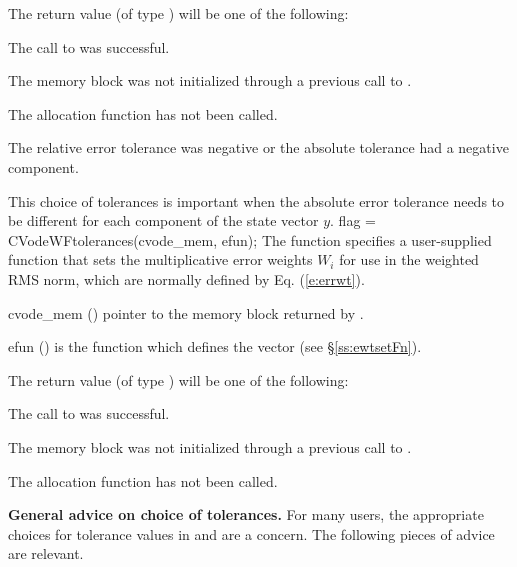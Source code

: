 {
  The return value  (of type ) will be one of the following:
  \begin{args}
  \item[\Id{CV\_SUCCESS}]
    The call to  was successful.
  \item[\Id{CV\_MEM\_NULL}] 
    The {\cvode} memory block was not initialized through a previous call to
    .
  \item[\Id{CV\_NO\_MALLOC}] 
    The allocation function  has not been called.
  \item[\Id{CV\_ILL\_INPUT}] 
    The relative error tolerance was negative or the absolute tolerance
    had a negative component.
  \end{args}
}
{
  This choice of tolerances is important when the absolute error tolerance needs to
  be different for each component of the state vector $y$. 
}
{
  flag = CVodeWFtolerances(cvode\_mem, efun);
}
{
  The function  specifies a user-supplied function 
  that sets the multiplicative error weights $W_i$ for use in the weighted
  RMS norm, which are normally defined by Eq. (\ref{e:errwt}).
}
{
  \begin{args}
  \item[cvode\_mem] ()
    pointer to the {\cvode} memory block returned by .
  \item[efun] () 
    is the {\CC} function which defines the  vector (see
    \S\ref{ss:ewtsetFn}).
  \end{args}
}
{
  The return value  (of type ) will be one of the following:
  \begin{args}
  \item[\Id{CV\_SUCCESS}]
    The call to  was successful.
  \item[\Id{CV\_MEM\_NULL}] 
    The {\cvode} memory block was not initialized through a previous call to
    .
  \item[\Id{CV\_NO\_MALLOC}] 
    The allocation function  has not been called.
  \end{args}
}
{}

{\bf General advice on choice of tolerances.}
For many users, the appropriate choices for tolerance values in
 and  are a concern.  The following pieces of
advice are relevant.

